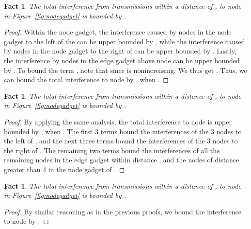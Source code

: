 \documentclass{article}
\newtheorem{fact}[lemma]{Fact}
\begin{document}
\begin{fact}\label{fact:v}
The total interference from transmissions within a distance of , to node  in Figure~\ref{fig:nodegadget} is bounded by .
\end{fact}
\begin{proof}
Within the node gadget, the interference caused by nodes in the node gadget to the left of the  can be upper bounded by , while the interference caused by nodes in the node gadget to the right of  can be upper bounded by .  Lastly, the interference by nodes in the edge gadget above node  can be upper bounded by .  To bound the term , note that  since  is nonincreasing. We thus get .  Thus, we can bound the total interference to node  by , when .
\end{proof}

\begin{fact}\label{fact:boundary}
The total interference from transmissions within a distance of , to node  in Figure~\ref{fig:nodegadget} is bounded by .
\end{fact}
\begin{proof}
By applying the same analysis, the total interference to node  is upper bounded by , when .  The first 3 terms bound the interferences of the 3 nodes to the left of , and the next three terms bound the interferences of the 3 nodes to the right of .  The remaining two terms bound the interferences of all the remaining nodes in the edge gadget within distance , and the nodes of distance greater than 4 in the node gadget of .
\end{proof}


\begin{fact}\label{fact:w}
The total interference from transmissions within a distance of , to node  in Figure~\ref{fig:nodegadget} is bounded by .
\end{fact}
\begin{proof}
By similar reasoning as in the previous proofs, we bound the interference to node  by .
\end{proof}
\end{document}
